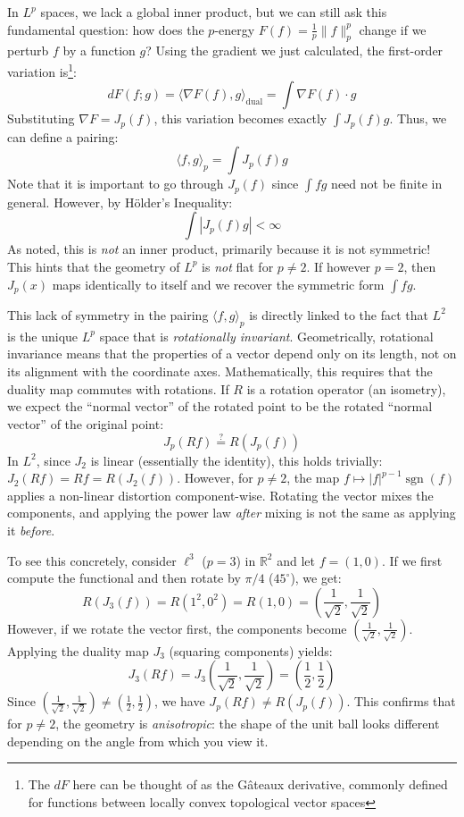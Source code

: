 \documentclass{article}
\newcommand{\R}{{\mathbb{R}}}
\newcommand{\sgn}{{\operatorname{sgn}}}
\begin{document}
In $L^p$ spaces, we lack a global inner product, but we can still ask this fundamental question: how does the
$p$-energy $F(f) = \frac{1}{p}\|f\|_p^p$ change if we perturb $f$ by a function $g$? Using the gradient we
just calculated, the first-order variation is\footnote{The $dF$ here can be thought of as the G\^ateaux
derivative, commonly defined for functions between locally convex topological vector spaces}:
\[
d F(f; g) = \langle \nabla F(f), g \rangle_{\text{dual}} = \int \nabla F(f) \cdot g
\]
Substituting $\nabla F = J_p(f)$, this variation becomes exactly $\int J_p(f)g$. Thus, we can define a pairing:
\[
	\langle f,g \rangle_p = \int J_p(f)g
\]
Note that it is important to go through $J_p(f)$ since $\int fg$ need not be finite in general. However, by H\"older's Inequality:
\[
	\int |J_p(f)g| < \infty
\]
As noted, this is \emph{not} an inner product, primarily because it is not symmetric! This hints that the geometry
of $L^p$ is \emph{not} flat for $p \ne 2$. If however $p = 2$, then $J_p(x)$ maps identically to itself and we
recover the symmetric form $\int fg$.

This lack of symmetry in the pairing $\langle f,g \rangle_p$ is directly linked to the fact that $L^2$ is the
unique $L^p$ space that is \emph{rotationally invariant}. Geometrically, rotational invariance means that the
properties of a vector depend only on its length, not on its alignment with the coordinate axes.
Mathematically, this requires that the duality map commutes with rotations. If $R$ is a rotation operator
(an isometry), we expect the ``normal vector'' of the rotated point to be the rotated ``normal
vector'' of the original point:
\[
	J_p(Rf) \overset{?}{=} R(J_p(f))
\]
In $L^2$, since $J_2$ is linear (essentially the identity), this holds trivially: $J_2(Rf) = Rf = R(J_2(f))$.
However, for $p \ne 2$, the map $f \mapsto |f|^{p-1}\sgn(f)$ applies a non-linear distortion component-wise.
Rotating the vector mixes the components, and applying the power law \emph{after} mixing is not the same as
applying it \emph{before}.

To see this concretely, consider $\ell^3$ ($p=3$) in $\R^2$ and let $f = (1, 0)$. If we first compute the functional and then rotate by $\pi/4$ ($45^\circ$), we get:
\[
	R(J_3(f)) = R(1^2, 0^2) = R(1, 0) = \left( \frac{1}{\sqrt{2}}, \frac{1}{\sqrt{2}} \right)
\]
However, if we rotate the vector first, the components become $(\frac{1}{\sqrt{2}}, \frac{1}{\sqrt{2}})$.
Applying the duality map $J_3$ (squaring components) yields:
\[
	J_3(Rf) = J_3\left( \frac{1}{\sqrt{2}}, \frac{1}{\sqrt{2}} \right) = \left( \frac{1}{2}, \frac{1}{2} \right)
\]
Since $(\frac{1}{\sqrt{2}}, \frac{1}{\sqrt{2}}) \ne (\frac{1}{2}, \frac{1}{2})$, we have $J_p(Rf) \ne
R(J_p(f))$. This confirms that for $p \ne 2$, the geometry is \emph{anisotropic}: the shape of the unit ball looks different depending on the angle from which you view it.
\end{document}
